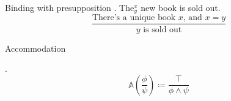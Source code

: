 \documentclass{beamer}
\begin{document}
\begin{frame}{Binding with presupposition}
  \ex. The$^x_y$ new book is sold out.
  $$\displaystyle\frac{\text{There's a unique book $x$, and $x=y$}}{\text{$y$ is sold out}}$$

\end{frame}

\begin{frame}{Accommodation}

  \ex. \[\mathbb{A}\left(\frac{\phi}{\psi}\right) \coloneq \displaystyle\frac{\top}{\phi\land\psi}\]

\end{frame}


%
%
\end{document}
